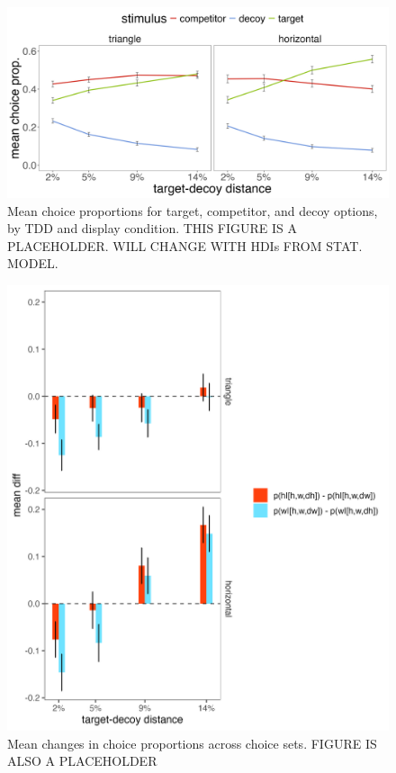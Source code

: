 \begin{figure}
   \includegraphics[width=\textwidth]{figures/choicePhase_att_trials_mean_choice_props_collapsed.jpg}
   \caption{Mean choice proportions for target, competitor, and decoy options, by TDD and display condition. THIS FIGURE IS A PLACEHOLDER. WILL CHANGE WITH HDIs FROM STAT. MODEL.}
   \label{fig:e2_choiceprops}
\end{figure}

\begin{figure}
   \includegraphics[width=\textwidth]{figures/choicePhase_delta_means.jpeg}
   \caption{Mean changes in choice proportions across choice sets. FIGURE IS ALSO A PLACEHOLDER}
   \label{e2_choicedeltas}
\end{figure}

